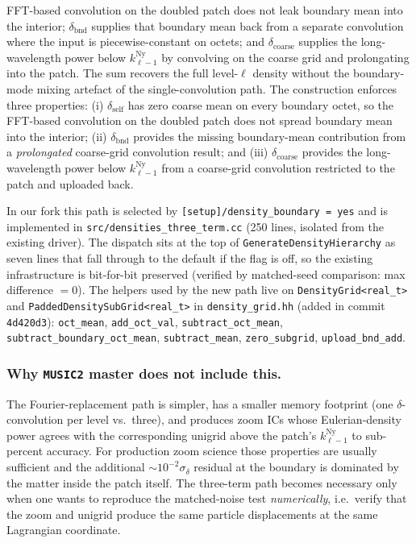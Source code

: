 \documentclass[12pt]{article}
\newcommand{\code}[1]{\texttt{#1}}
\begin{document}
FFT-based convolution on the doubled patch does not leak boundary
mean into the interior; $\delta_\mathrm{bnd}$ supplies that
boundary mean back from a separate convolution where the input is
piecewise-constant on octets; and $\delta_\mathrm{coarse}$ supplies
the long-wavelength power below $k^\mathrm{Ny}_{\ell-1}$ by
convolving on the coarse grid and prolongating into the patch.
The sum recovers the full level-$\ell$ density without the
boundary-mode mixing artefact of the single-convolution path.  The construction enforces three properties:
(i) $\delta_\mathrm{self}$ has zero coarse mean on every boundary
octet, so the FFT-based convolution on the doubled patch does not
spread boundary mean into the interior; (ii) $\delta_\mathrm{bnd}$
provides the missing boundary-mean contribution from a
\emph{prolongated} coarse-grid convolution result; and (iii)
$\delta_\mathrm{coarse}$ provides the long-wavelength power below
$k^\mathrm{Ny}_{\ell-1}$ from a coarse-grid convolution restricted
to the patch and uploaded back.

In our fork this path is selected by
\code{[setup]/density\_boundary = yes} and is implemented in
\code{src/densities\_three\_term.cc} (250 lines, isolated from the
existing driver).  The dispatch sits at the top of
\code{GenerateDensityHierarchy} as seven lines that fall through to
the default if the flag is off, so the existing infrastructure is
bit-for-bit preserved (verified by matched-seed comparison: max
difference $= 0$).  The helpers used by the new path live on
\code{DensityGrid<real\_t>} and \code{PaddedDensitySubGrid<real\_t>}
in \code{density\_grid.hh} (added in commit \texttt{4d420d3}):
\code{oct\_mean}, \code{add\_oct\_val},
\code{subtract\_oct\_mean}, \code{subtract\_boundary\_oct\_mean},
\code{subtract\_mean}, \code{zero\_subgrid}, \code{upload\_bnd\_add}.

\subsubsection*{Why \texttt{MUSIC2} master does not include this.}
The Fourier-replacement path is simpler, has a smaller memory
footprint (one $\delta$-convolution per level vs.\ three), and
produces zoom ICs whose Eulerian-density power agrees with the
corresponding unigrid above the patch's $k^\mathrm{Ny}_{\ell-1}$ to
sub-percent accuracy.  For production zoom science those properties
are usually sufficient and the additional $\sim 10^{-2}\sigma_\delta$
residual at the boundary is dominated by the matter inside the patch
itself.  The three-term path becomes necessary only when one wants
to reproduce the matched-noise test \emph{numerically}, i.e.\
verify that the zoom and unigrid produce the same particle
displacements at the same Lagrangian coordinate.
\end{document}
